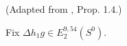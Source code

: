 \begin{definition}
\label{frontier:Literature:b367d2906c16}
(Adapted from \cite{BR21}, Prop. 1.4.)\par{}

Fix $\Delta h_1g\in E_2^{9,54}(S^0)$.
\end{definition}

